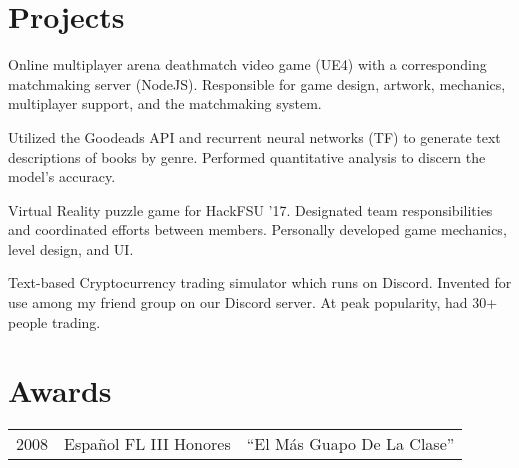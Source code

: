 \documentclass[]{deedy_resume}
\begin{document}
\begin{minipage}[t]{0.63\textwidth}

\section{Projects}
Online multiplayer arena deathmatch video game (UE4) with a corresponding matchmaking server (NodeJS). Responsible for game design, artwork, mechanics, multiplayer support, and the matchmaking system.
\sectionsep

Utilized the Goodeads API and recurrent neural networks (TF) to generate text descriptions of books by genre. Performed quantitative analysis to discern the model's accuracy.
\sectionsep

Virtual Reality puzzle game for HackFSU '17. Designated team responsibilities and coordinated efforts between members. Personally developed game mechanics, level design, and  UI.
\sectionsep

Text-based Cryptocurrency trading simulator which runs on Discord. Invented for use among my friend group on our Discord server. At peak popularity, had 30+ people trading.
\sectionsep


\section{Awards} 
\begin{tabular}{rll}
2008	 & Espa\~nol FL III Honores  & ``El M\'as Guapo De La Clase'' \\
\end{tabular}
\sectionsep


\begin{comment}
\section{Publications} 
\renewcommand\refname{\vskip -1.5cm} %


\nocite{*}
\end{comment}

\end{minipage} 
\end{document}
